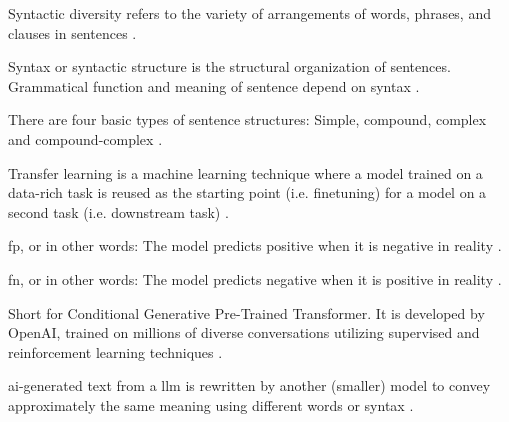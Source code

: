 \begin{definition}
    Syntactic diversity refers to the variety of arrangements of words, phrases, and clauses in sentences \cite{kurt_pehlivanoglu_comparative_2024}.
\end{definition}

\begin{definition}
    [Syntax]
    Syntax or syntactic structure is the structural organization of sentences.
    Grammatical function and meaning of sentence depend on syntax \cite{kurt_pehlivanoglu_comparative_2024}.
\end{definition}

\begin{definition}
    There are four basic types of sentence structures: Simple, compound, complex and compound-complex \cite{kurt_pehlivanoglu_comparative_2024}.
\end{definition}

\begin{definition}
    Transfer learning is a machine learning technique where a model trained on a data-rich task is 
    reused as the starting point (i.e. finetuning) for a model on a second task (i.e. downstream task) \cite{palivela_optimization_2021}.
\end{definition}

\begin{definition}
    \ac{fp}, or in other words: The model predicts positive when it is negative in reality \cite{palivela_optimization_2021}.
\end{definition}

\begin{definition}
    \ac{fn}, or in other words: The model predicts negative when it is positive in reality \cite{palivela_optimization_2021}.
\end{definition}

\begin{definition}
    [ChatGPT]
    Short for Conditional Generative Pre-Trained Transformer.
    It is developed by OpenAI, trained on millions of diverse conversations utilizing supervised and reinforcement learning techniques \cite{kurt_pehlivanoglu_comparative_2024}.
\end{definition}

\begin{definition}
    \ac{ai}-generated text from a \ac{llm} is rewritten by another (smaller) model to convey approximately the same meaning using different words or syntax \cite{krishna_paraphrasing_2023}.
\end{definition}

